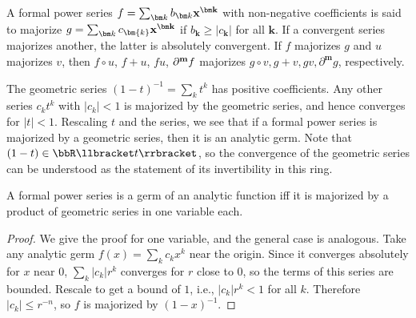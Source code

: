 \begin{defn}[Majorants]
    A formal power series $f=\sum_{\bm k} b_{\bm k}\bf{x}^{\bm k}$ with non-negative coefficients is said to majorize $g=\sum_{\bm k} c_{\bm{k}}\bf{x}^{\bm k}$ if $b_{\bm k}\geq |c_{\bm k}|$ for all $\bm{k}$. If a convergent series majorizes another, the latter is absolutely convergent. If $f$ majorizes $g$ and $u$ majorizes $v$, then $f\circ u$, $f+u$, $fu$, $\partial^{\bf{m}}f$ majorizes $g\circ v,g+v,gv,\partial^{\bm m}g$, respectively. 
\end{defn}

\begin{example}
    The geometric series $(1-t)^{-1}=\sum_k t^k$ has positive coefficients. Any other series $c_k t^k$ with $|c_k|<1$ is majorized by the geometric series, and hence converges for $|t|<1$.  Rescaling $t$ and the series, we see that if a formal power series is majorized by a geometric series, then it is an analytic germ. Note that $(1-t)\in\bbR\llbracket t\rrbracket$, so the convergence of the geometric series can be understood as the statement of its invertibility in this ring.
\end{example}

\begin{lem}\label{lem 121}
    A formal power series is a germ of an analytic function iff it is majorized by a product of geometric series in one variable each.
\end{lem}
\begin{proof}
    We give the proof for one variable, and the general case is analogous. Take any analytic germ $f(x)=\sum_k c_k x^k$ near the origin. Since it converges absolutely for $x$ near $0$, $\sum_k |c_k| r^k$ converges for $r$ close to $0$, so the terms of this series are bounded. Rescale to get a bound of $1$, i.e., $|c_k|r^k<1$ for all $k$. 
    Therefore $|c_k|\leq r^{-n}$, so $f$ is majorized by $(1-x)^{-1}$.
\end{proof}

